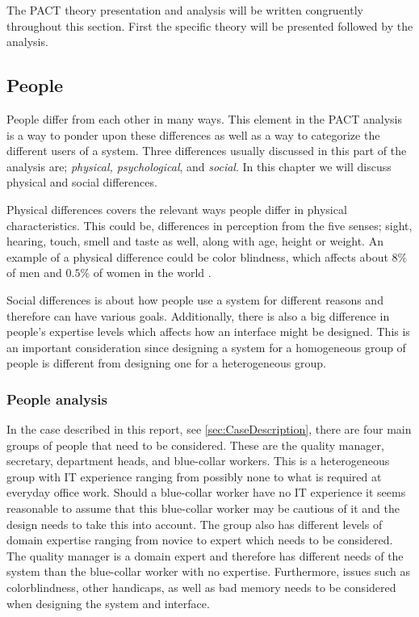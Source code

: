 The PACT theory presentation and analysis will be written congruently throughout this section.
First the specific theory will be presented followed by the analysis.

\subsection{People}\label{sec:PACT-people}
People differ from each other in many ways.
This element in the PACT analysis is a way to ponder upon these differences as well as a way to categorize the different users of a system.
Three differences usually discussed in this part of the analysis are; \textit{physical, psychological}, and \textit{social}.
In this chapter we will discuss physical and social differences.

Physical differences covers the relevant ways people differ in physical characteristics.
This could be, differences in perception from the five senses; sight, hearing, touch, smell and taste as well, along with age, height or weight.
An example of a physical difference could be color blindness, which affects about $8\%$ of men and $0.5\%$ of women in the world \cite{ColourBlind}.

Social differences is about how people use a system for different reasons and therefore can have various goals.
Additionally, there is also a big difference in people's expertise levels which affects how an interface might be designed.
This is an important consideration since designing a system for a homogeneous group of people is  different from designing one for a heterogeneous group.

\subsubsection*{People analysis}
In the case described in this report, see \cref{sec:CaseDescription}, there are four main groups of people that need to be considered.
These are the quality manager, secretary, department heads, and blue-collar workers.
This is a heterogeneous group with IT experience ranging from possibly none to what is required at everyday office work.
Should a blue-collar worker have no IT experience it seems reasonable to assume that this blue-collar worker may be cautious of it and the design needs to take this into account.
The group also has different levels of domain expertise ranging from novice to expert which needs to be considered.
The quality manager is a domain expert and therefore has different needs of the system than the blue-collar worker with no expertise.
Furthermore, issues such as colorblindness, other handicaps, as well as bad memory needs to be considered when designing the system and interface.

